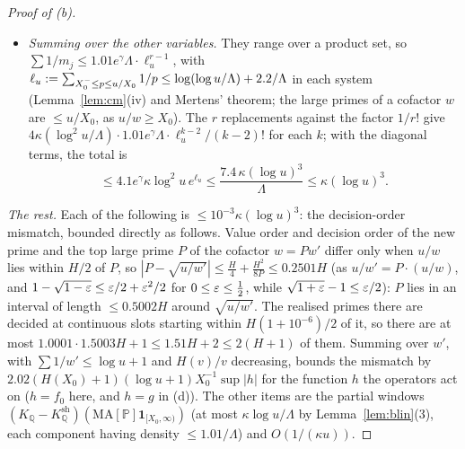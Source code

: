 \begin{proof}[Proof of (b)]
\begin{itemize}
\item \emph{Summing over the other variables.} They range over a product set, so
$\sum1/m_j\le1.01e^{\gamma}\Lambda\cdot\ell_u^{r-1}$, with $\ell_u:=\sum_{X_0^{-}\le p\le u/X_0}1/p\le\log(\log u/\Lambda)+2.2/\Lambda$ in
each system (Lemma~\ref{lem:cm}(iv) and Mertens' theorem; the large primes of a cofactor $w$ are $\le u/X_0$, as
$u/w\ge X_0$). The $r$ replacements against the factor $1/r!$ give
$4\kappa(\log^2u/\Lambda)\cdot1.01e^{\gamma}\Lambda\cdot\ell_u^{k-2}/(k-2)!$ for each $k$; with the diagonal terms, the total is
\[
  \le4.1e^{\gamma}\kappa\log^2u\,e^{\ell_u}\le\frac{7.4\,\kappa(\log u)^3}{\Lambda}\le\kappa(\log u)^3 .
\]
\end{itemize}

\emph{The rest.} Each of the following is $\le10^{-3}\kappa(\log u)^3$:
the decision-order mismatch, bounded directly as follows. Value order and decision order of the new prime and the top large prime $P$
of the cofactor $w=Pw'$ differ only when $u/w$ lies within $H/2$ of $P$, so $|P-\sqrt{u/w'}|\le\frac H4+\frac{H^2}{8P}\le0.2501H$ (as $u/w'=P\cdot(u/w)$, and
$1-\sqrt{1-\varepsilon}\le\varepsilon/2+\varepsilon^2/2$ for $0\le\varepsilon\le\frac12$, while $\sqrt{1+\varepsilon}-1\le\varepsilon/2$): $P$ lies in an interval of
length $\le0.5002H$ around $\sqrt{u/w'}$. The realised primes there are decided at continuous slots starting within $H(1+10^{-6})/2$
of it, so there are at most $1.0001\cdot1.5003H+1\le1.51H+2\le2(H+1)$ of them. Summing over $w'$, with $\sum1/w'\le\log u+1$ and $H(v)/v$ decreasing,
bounds the mismatch by $2.02(H(X_0)+1)(\log u+1)X_0^{-1}\sup|h|$ for the function $h$ the operators act on ($h=f_0$ here, and
$h=g$ in (d)). The other items are the partial windows $(K_{\mathbb Q}-K^{\mathrm{sh}}_{\mathbb Q})(\mathrm{MA}[\mathbb P]\mathbf 1_{[X_0,\infty)})$
(at most $\kappa\log u/\Lambda$ by Lemma~\ref{lem:blin}(3), each component having density $\le1.01/\Lambda$) and $O(1/(\kappa u))$.
\end{proof}

